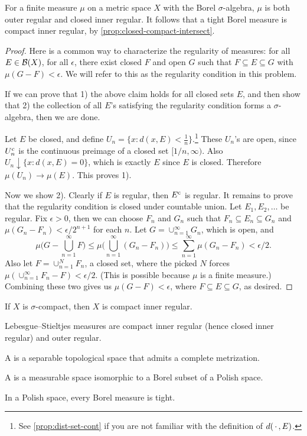 \begin{thm}
    For a finite measure $\mu$ on a metric space $X$ with the Borel $\sigma$-algebra, $\mu$ is both outer regular and closed inner regular. It follows that a tight Borel measure is compact inner regular, by \cref{prop:closed-compact-intersect}.
\end{thm}
\begin{proof}
    Here is a common way to characterize the regularity of measures: for all $E\in \mathcal{B}(X)$, for all $\epsilon$, there exist closed $F$ and open $G$ such that $F\subseteq E \subseteq G$ with $\mu(G - F) < \epsilon$. We will refer to this as the regularity condition in this problem.

    If we can prove that 1) the above claim holds for all closed sets $E$, and then show that 2) the collection of all $E$'s satisfying the regularity condition forms a $\sigma$-algebra, then we are done.

    Let $E$ be closed, and define $U_n = \{x : d(x,E) < \frac{1}{n}\}$.\footnote{See \cref{prop:dist-set-cont} if you are not familiar with the definition of $d(\,\cdot\,,E)$.} These $U_n$'s are open, since $U_n^{\mathrm{c}}$ is the continuous preimage of a closed set $[1/n,\infty)$. Also $U_n \downarrow \{x : d(x,E) = 0 \}$, which is exactly $E$ since $E$ is closed. Therefore $\mu(U_n) \to \mu(E)$. This proves 1).

    Now we show 2). Clearly if $E$ is regular, then $E^{\mathrm{c}}$ is regular. It remains to prove that the regularity condition is closed under countable union. Let $E_1,E_2,\dotsc$ be regular. Fix $\epsilon > 0$, then we can choose $F_n$ and $G_n$ such that $F_n \subseteq E_n \subseteq G_n$ and $\mu(G_n - F_n) < \epsilon/2^{n+1}$ for each $n$. Let $G = \cup_{n=1}^\infty G_n$, which is open, and \[\mu\biggl(G - \bigcup_{n=1}^\infty F\biggr) \leq \mu\biggl(\bigcup_{n=1}^\infty (G_n - F_n)\biggr) \leq \sum_{n=1}^\infty \mu(G_n -F_n) < \epsilon / 2.\] Also let $F = \cup_{n=1}^N F_n$, a closed set, where the picked $N$ forces $\mu(\cup_{n=1}^\infty F_n - F) < \epsilon/2$. (This is possible because $\mu$ is a finite measure.) Combining these two gives us $\mu(G - F) < \epsilon$, where $F \subseteq E \subseteq G$, as desired.
\end{proof}

If $X$ is $\sigma$-compact, then $X$ is compact inner regular.

\begin{thm}
    Lebesgue--Stieltjes measures are compact inner regular (hence closed inner regular) and outer regular.
\end{thm}

\begin{defn}
    A  is a separable topological space that admits a complete metrization.
    
    A  is a measurable space isomorphic to a Borel subset of a Polish space.
\end{defn}


\begin{namedthm}
    In a Polish space, every Borel measure is tight.
\end{namedthm}